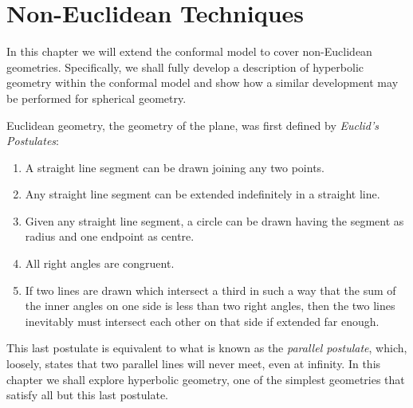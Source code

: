 \begin{savequote}
\end{savequote}

\chapter{Non-Euclidean Techniques}
\label{chap:noneuclid}

In this chapter we will extend the conformal model to cover non-Euclidean
geometries. Specifically, we shall fully develop a description of hyperbolic
geometry within the conformal model and show how a similar development may be
performed for spherical geometry.

Euclidean geometry, the geometry of the plane, was first defined\cite{Heath56} by
\emph{Euclid's Postulates}:

\begin{enumerate}
\item A straight line segment can be drawn joining any two points. 
\item Any straight line segment can be extended indefinitely in a straight line. 
\item Given any straight line segment, a circle can be drawn having the segment as radius and one endpoint as centre. 
\item All right angles are congruent. 
\item If two lines are drawn which intersect a third in such a way that the sum of the inner angles on one side is less than two right angles, then the two lines inevitably must intersect each other on that side if extended far enough.
\end{enumerate} 

This last postulate is equivalent to what is known as the \emph{parallel postulate},
which, loosely, states that two parallel lines will never meet, even at infinity.
In this chapter we shall explore hyperbolic geometry, one of the simplest
geometries that satisfy all but this last postulate.



